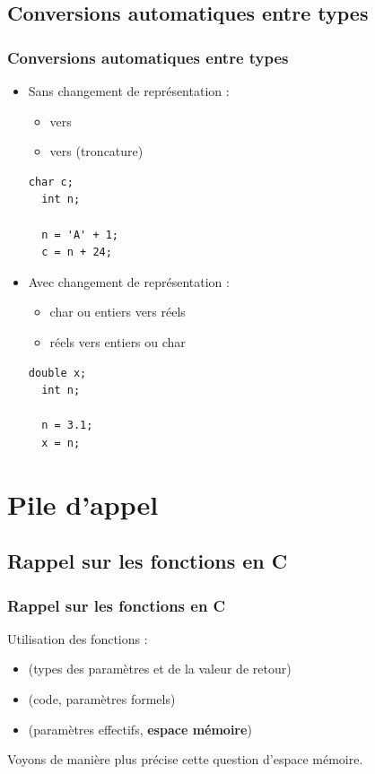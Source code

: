 \documentclass[xcolor=pdftex,svgnames,table]{beamer}
\begin{document}
\subsection[Conversions]{Conversions automatiques entre types}
\begin{frame}[fragile]
  \frametitle{Conversions  automatiques entre types}
\pause
  \begin{itemize}
\item Sans changement de représentation  :
  \begin{itemize}
    \item {} vers 
    \item {} vers  (troncature)
  \end{itemize}\pause
  \begin{lstlisting}[basicstyle=\ttfamily\small] 
  char c;
  int n;
  
  n = 'A' + 1;
  c = n + 24;
   \end{lstlisting}  \pause
 \item Avec changement de représentation :
    \begin{itemize}
    \item char ou entiers vers réels
    \item réels vers entiers ou char
    \end{itemize}
  \begin{lstlisting}[basicstyle=\ttfamily\small] 
  double x;
  int n;
  
  n = 3.1;
  x = n;
   \end{lstlisting}  \pause
  \end{itemize}
\end{frame}

\section{Pile d'appel}
\subsection{Rappel sur les fonctions en C}
\begin{frame}
  \frametitle{Rappel sur les fonctions en C\nowrite}
 Utilisation des fonctions :
  \begin{itemize}
    \item {} (types des paramètres et de la valeur de retour)
    \item {}  (code, paramètres formels)
    \item {} (paramètres effectifs, \textbf{espace mémoire})
  \end{itemize}
\pause
Voyons de manière plus précise cette question d'espace mémoire.
\end{frame}
\end{document}
